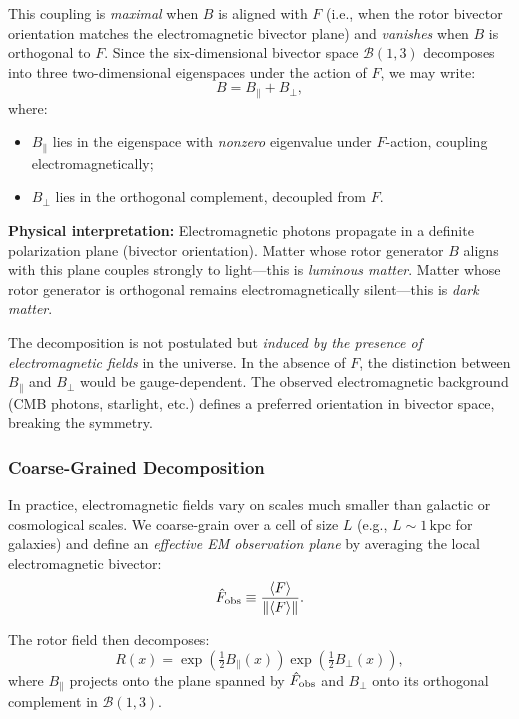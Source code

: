 \documentclass[11pt,a4paper]{article}
\numberwithin{equation}{section}
\theoremstyle{plain}
\theoremstyle{definition}
\theoremstyle{remark}
\newcommand{\norm}[1]{\left\lVert#1\right\rVert}
\newcommand{\avg}[1]{\left\langle #1 \right\rangle}
\newcommand{\bivec}{\mathcal{B}}            %
\begin{document}
This coupling is \emph{maximal} when $B$ is aligned with $F$ (i.e., when the rotor bivector orientation matches the electromagnetic bivector plane) and \emph{vanishes} when $B$ is orthogonal to $F$. Since the six-dimensional bivector space $\bivec(1,3)$ decomposes into three two-dimensional eigenspaces under the action of $F$, we may write:
\begin{equation}
B = B_\parallel + B_\perp,
\end{equation}
where:
\begin{itemize}[leftmargin=*]
  \item $B_\parallel$ lies in the eigenspace with \emph{nonzero} eigenvalue under $F$-action, coupling electromagnetically;
  \item $B_\perp$ lies in the orthogonal complement, decoupled from $F$.
\end{itemize}

\textbf{Physical interpretation:} Electromagnetic photons propagate in a definite polarization plane (bivector orientation). Matter whose rotor generator $B$ aligns with this plane couples strongly to light---this is \emph{luminous matter}. Matter whose rotor generator is orthogonal remains electromagnetically silent---this is \emph{dark matter}.

The decomposition is not postulated but \emph{induced by the presence of electromagnetic fields} in the universe. In the absence of $F$, the distinction between $B_\parallel$ and $B_\perp$ would be gauge-dependent. The observed electromagnetic background (CMB photons, starlight, etc.) defines a preferred orientation in bivector space, breaking the symmetry.

\subsubsection{Coarse-Grained Decomposition}

In practice, electromagnetic fields vary on scales much smaller than galactic or cosmological scales. We coarse-grain over a cell of size $L$ (e.g., $L\sim 1\,\text{kpc}$ for galaxies) and define an \emph{effective EM observation plane} by averaging the local electromagnetic bivector:
\begin{equation}
\hat F_{\rm obs} \equiv \frac{\avg{F}}{\norm{\avg{F}}}.
\end{equation}

The rotor field then decomposes:
\begin{equation}
R(x)=\exp\!\left(\tfrac12 B_\parallel(x)\right)\exp\!\left(\tfrac12 B_\perp(x)\right),
\label{eq:rotor-decomp}
\end{equation}
where $B_\parallel$ projects onto the plane spanned by $\hat F_{\rm obs}$ and $B_\perp$ onto its orthogonal complement in $\bivec(1,3)$.
\end{document}
